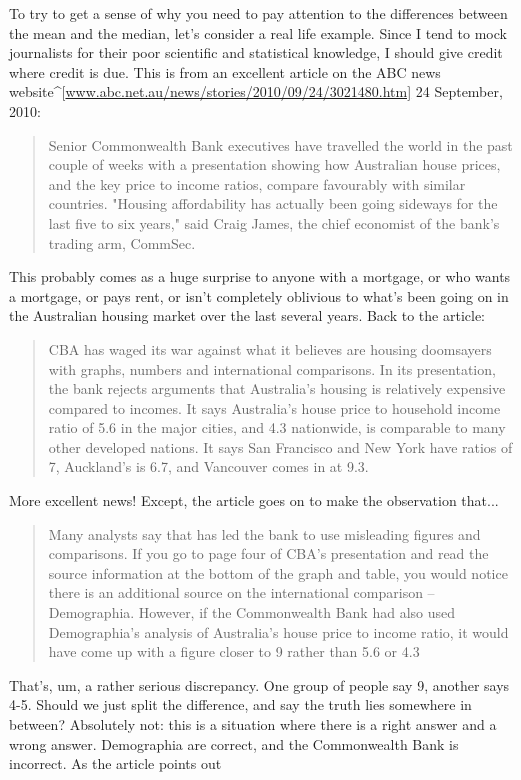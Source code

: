 To try to get a sense of why you need to pay attention to the differences between the mean and the median, let's consider a real life example. Since I tend to mock journalists for their poor scientific and statistical knowledge, I should give credit where credit is due. This is from an excellent article on the ABC news website^[\url{www.abc.net.au/news/stories/2010/09/24/3021480.htm]} 24 September, 2010:
\begin{quote}
Senior Commonwealth Bank executives have travelled the world in the past couple of weeks with a presentation showing how Australian house prices, and the key price to income ratios, compare favourably with similar countries. "Housing affordability has actually been going sideways for the last five to six years," said Craig James, the chief economist of the bank's trading arm, CommSec.
\end{quote}
This probably comes as a huge surprise to anyone with a mortgage, or who wants a mortgage, or pays rent, or isn't completely oblivious to what's been going on in the Australian housing market over the last several years. Back to the article:
\begin{quote}
CBA has waged its war against what it believes are housing doomsayers with graphs, numbers and international comparisons. In its presentation, the bank rejects arguments that Australia's housing is relatively expensive compared to incomes. It says Australia's house price to household income ratio of 5.6 in the major cities, and 4.3 nationwide, is comparable to many other developed nations. It says San Francisco and New York have ratios of 7, Auckland's is 6.7, and Vancouver comes in at 9.3.
\end{quote}
More excellent news! Except, the article goes on to make the observation that...
\begin{quote}
Many analysts say that has led the bank to use misleading figures and comparisons. If you go to page four of CBA's presentation and read the source information at the bottom of the graph and table, you would notice there is an additional source on the international comparison -- Demographia. However, if the Commonwealth Bank had also used Demographia's analysis of Australia's house price to income ratio, it would have come up with a figure closer to 9 rather than 5.6 or 4.3
\end{quote}
That's, um, a rather serious discrepancy. One group of people say 9, another says 4-5. Should we just split the difference, and say the truth lies somewhere in between? Absolutely not: this is a situation where there is a right answer and a wrong answer. Demographia are correct, and the Commonwealth Bank is incorrect. As the article points out
